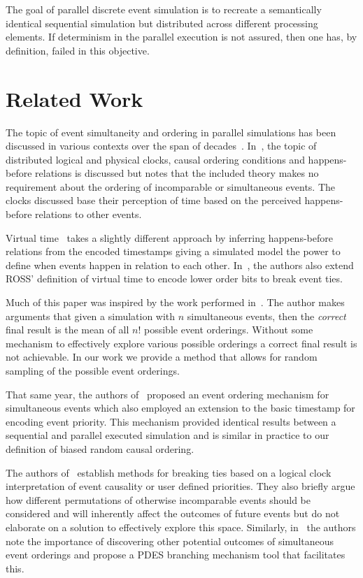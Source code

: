 \documentclass[nonacm,sigconf]{acmart}
\begin{document}
The goal of parallel discrete event simulation is to recreate a semantically identical sequential simulation but distributed across different processing elements. If determinism in the parallel execution is not assured, then one has, by definition, failed in this objective.

\section{Related Work}
The topic of event simultaneity and ordering in parallel simulations has been discussed in various contexts over the span of decades~\cite{rajaei1993,ronngren1999,kim1997,peschlow2006,peschlow2007tool,peschlow2007,lamport1978,wieland1997}. In~\cite{lamport1978}, the topic of distributed logical and physical clocks, causal ordering conditions and happens-before relations is discussed but notes that the included theory makes no requirement about the ordering of incomparable or simultaneous events. The clocks discussed base their perception of time based on the perceived happens-before relations to other events.

Virtual time~\cite{jefferson1985} takes a slightly different approach by inferring happens-before relations from the encoded timestamps giving a simulated model the power to define when events happen in relation to each other. In~\cite{schordan2020reversible}, the authors also extend ROSS' definition of virtual time to encode lower order bits to break event ties.

Much of this paper was inspired by the work performed in~\cite{wieland1997}. The author makes arguments that given a simulation with $n$ simultaneous events, then the \emph{correct} final result is the mean of all $n!$ possible event orderings. Without some mechanism to effectively explore various possible orderings a correct final result is not achievable. In our work we provide a method that allows for random sampling of the possible event orderings.

That same year, the authors of~\cite{kim1997} proposed an event ordering mechanism for simultaneous events which also employed an extension to the basic timestamp for encoding event priority. This mechanism provided identical results between a sequential and parallel executed simulation and is similar in practice to our definition of biased random causal ordering.

The authors of~\cite{ronngren1999} establish methods for breaking ties based on a logical clock interpretation of event causality or user defined priorities. They also briefly argue how different permutations of otherwise incomparable events should be considered and will inherently affect the outcomes of future events but do not elaborate on a solution to effectively explore this space. Similarly, in~\cite{peschlow2006,peschlow2007tool,peschlow2007} the authors note the importance of discovering other potential outcomes of simultaneous event orderings and propose a PDES branching mechanism tool that facilitates this.
\end{document}
